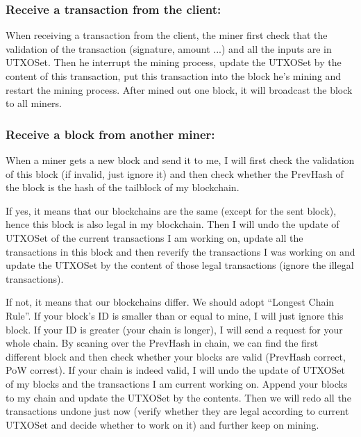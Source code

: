 \documentclass{article}
\begin{document}
\begin{spacing}{1.0}
		\subsubsection{Receive a transaction from the client:} When receiving a transaction from the client, the miner first check that the validation of the transaction (signature, amount ...) and all the inputs are in UTXOSet. Then he interrupt the mining process, update the UTXOSet by the content of this transaction, put this transaction into the block he's mining and restart the mining process.
		After mined out one block, it will broadcast the block to all miners.
		\subsubsection{Receive a block from another miner:} When a miner gets a new block and send it to me, I will first check the validation of this block (if invalid, just ignore it) and then check whether the PrevHash of the block is the hash of the tailblock of my blockchain. 
		
		If yes, it means that 
		our blockchains are the same (except for the sent block), hence this block is also legal in my blockchain. Then I will undo the update of UTXOSet of the current transactions I am working on, update all the transactions in this block and then reverify the transactions I was working on and update the UTXOSet by the content of those legal transactions (ignore the illegal transactions).
		
		If not, it means that our blockchains differ. We should adopt ``Longest Chain Rule''. If your block's ID is smaller than or equal to mine, I will just ignore this block. If your ID is greater (your chain is longer), I will send a request for your whole chain. By scaning over the PrevHash in chain, we can find the first different block and then check whether your blocks are valid (PrevHash correct, PoW correst). If your chain is 
		indeed valid, I will undo the update of UTXOSet of my blocks and the transactions I am current working on. Append your blocks to my chain and update the UTXOSet by the contents. Then we will redo all the transactions undone just now (verify whether they are legal according to current UTXOSet and decide whether to work on it) and further keep on mining.



\end{spacing}
\end{document}

